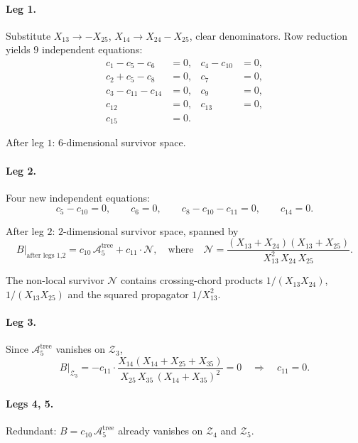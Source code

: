 \documentclass[11pt]{article}
\theoremstyle{plain}
\theoremstyle{definition}
\newcommand{\cA}{\mathcal{A}}
\newcommand{\cZ}{\mathcal{Z}}
\newcommand{\cN}{\mathcal{N}}
\begin{document}
\paragraph{Leg 1.} Substitute $X_{13} \to -X_{25}$, $X_{14} \to X_{24} - X_{25}$,
clear denominators. Row reduction yields $9$ independent equations:
\begin{equation}
\begin{aligned}
c_1 - c_5 - c_6 &= 0, & c_4 - c_{10} &= 0, \\
c_2 + c_5 - c_8 &= 0, & c_7 &= 0, \\
c_3 - c_{11} - c_{14} &= 0, & c_9 &= 0, \\
c_{12} &= 0, & c_{13} &= 0, \\
c_{15} &= 0. &&
\end{aligned}
\label{eq:leg1-5}
\end{equation}

After leg $1$: $6$-dimensional survivor space.

\paragraph{Leg 2.} Four new independent equations:
\begin{equation}
c_5 - c_{10} = 0, \qquad c_6 = 0, \qquad c_8 - c_{10} - c_{11} = 0, \qquad c_{14} = 0.
\label{eq:leg2-5}
\end{equation}

After leg $2$: $2$-dimensional survivor space, spanned by
\begin{equation}
B\big|_{\text{after legs 1,2}}
= c_{10}\, \cA_5^{\mathrm{tree}}
+ c_{11} \cdot \cN,
\quad\text{where}\quad
\cN = \frac{(X_{13} + X_{24})(X_{13} + X_{25})}{X_{13}^2\, X_{24}\, X_{25}}.
\label{eq:2d-survivor}
\end{equation}

The non-local survivor $\cN$ contains crossing-chord products $1/(X_{13} X_{24})$,
$1/(X_{13} X_{25})$ and the squared propagator $1/X_{13}^2$.

\paragraph{Leg 3.} Since $\cA_5^{\mathrm{tree}}$ vanishes on $\cZ_3$,
\[
B\big|_{\cZ_3} = -c_{11} \cdot \frac{X_{14}(X_{14} + X_{25} + X_{35})}{X_{25}\, X_{35}\, (X_{14}+X_{35})^2} = 0
\quad \Longrightarrow \quad c_{11} = 0.
\]

\paragraph{Legs 4, 5.} Redundant: $B = c_{10}\, \cA_5^{\mathrm{tree}}$ already vanishes
on $\cZ_4$ and $\cZ_5$.
\end{document}

